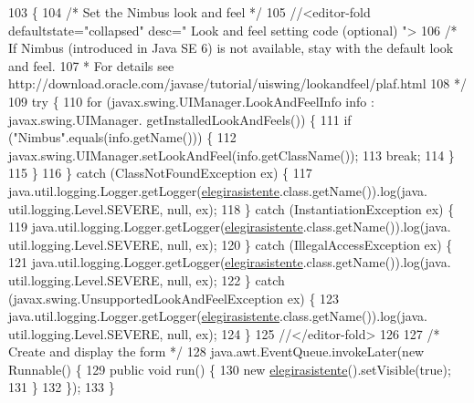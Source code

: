 \begin{DoxyCode}
103                                            \{
104         \textcolor{comment}{/* Set the Nimbus look and feel */}
105         \textcolor{comment}{//<editor-fold defaultstate="collapsed" desc=" Look and feel setting code (optional) ">}
106         \textcolor{comment}{/* If Nimbus (introduced in Java SE 6) is not available, stay with the default look and feel.}
107 \textcolor{comment}{         * For details see http://download.oracle.com/javase/tutorial/uiswing/lookandfeel/plaf.html }
108 \textcolor{comment}{         */}
109         \textcolor{keywordflow}{try} \{
110             \textcolor{keywordflow}{for} (javax.swing.UIManager.LookAndFeelInfo info : javax.swing.UIManager.
      getInstalledLookAndFeels()) \{
111                 \textcolor{keywordflow}{if} (\textcolor{stringliteral}{"Nimbus"}.equals(info.getName())) \{
112                     javax.swing.UIManager.setLookAndFeel(info.getClassName());
113                     \textcolor{keywordflow}{break};
114                 \}
115             \}
116         \} \textcolor{keywordflow}{catch} (ClassNotFoundException ex) \{
117             java.util.logging.Logger.getLogger(\mbox{\hyperlink{classinterfacessoguar_1_1elegirasistente_ae52ebd382dfff12ce74deef5f47afdf7}{elegirasistente}}.class.getName()).log(java.
      util.logging.Level.SEVERE, null, ex);
118         \} \textcolor{keywordflow}{catch} (InstantiationException ex) \{
119             java.util.logging.Logger.getLogger(\mbox{\hyperlink{classinterfacessoguar_1_1elegirasistente_ae52ebd382dfff12ce74deef5f47afdf7}{elegirasistente}}.class.getName()).log(java.
      util.logging.Level.SEVERE, null, ex);
120         \} \textcolor{keywordflow}{catch} (IllegalAccessException ex) \{
121             java.util.logging.Logger.getLogger(\mbox{\hyperlink{classinterfacessoguar_1_1elegirasistente_ae52ebd382dfff12ce74deef5f47afdf7}{elegirasistente}}.class.getName()).log(java.
      util.logging.Level.SEVERE, null, ex);
122         \} \textcolor{keywordflow}{catch} (javax.swing.UnsupportedLookAndFeelException ex) \{
123             java.util.logging.Logger.getLogger(\mbox{\hyperlink{classinterfacessoguar_1_1elegirasistente_ae52ebd382dfff12ce74deef5f47afdf7}{elegirasistente}}.class.getName()).log(java.
      util.logging.Level.SEVERE, null, ex);
124         \}
125         \textcolor{comment}{//</editor-fold>}
126 
127         \textcolor{comment}{/* Create and display the form */}
128         java.awt.EventQueue.invokeLater(\textcolor{keyword}{new} Runnable() \{
129             \textcolor{keyword}{public} \textcolor{keywordtype}{void} run() \{
130                 \textcolor{keyword}{new} \mbox{\hyperlink{classinterfacessoguar_1_1elegirasistente_ae52ebd382dfff12ce74deef5f47afdf7}{elegirasistente}}().setVisible(\textcolor{keyword}{true});
131             \}
132         \});
133     \}
\end{DoxyCode}


